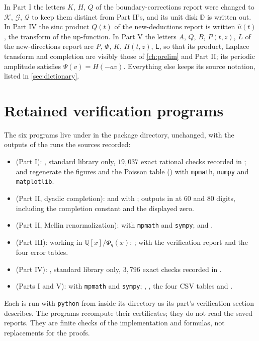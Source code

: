 \documentclass[11pt,a4paper,oneside,openany]{book}
\numberwithin{equation}{chapter}
\theoremstyle{definition}
\theoremstyle{remark}
\newcommand{\Q}{\mathbb Q}
\newcommand{\Lsad}{\mathsf L}
\begin{document}
In Part I the letters $K$, $H$, $Q$ of the boundary-corrections report were
changed to $\mathcal K$, $\mathcal G$, $\mathcal Q$ to keep them distinct
from Part II's, and its unit disk $\mathbb D$ is written out. In Part IV the
sinc product $Q(t)$ of the new-deductions report is written $\widehat u(t)$,
the transform of the up-function. In Part V the letters $A$, $Q$, $B$,
$P(t,z)$, $L$ of the new-directions report are $P$, $\Phi$, $K$, $\Pi(t,z)$,
$\Lsad$, so that its product, Laplace transform and completion are visibly
those of \cref{ch:prelim} and Part II; its periodic amplitude satisfies
$\Psi(v)=H(-av)$. Everything else keeps its source notation, listed in
\cref{sec:dictionary}.

\section{Retained verification programs}
The six programs live under  in the package directory,
unchanged, with the outputs of the runs the sources recorded:
\begin{itemize}
\item {} (Part I): , standard library only,
$19{,}037$ exact rational checks recorded in ;
 and  regenerate the figures
and the Poisson table () with
\texttt{mpmath}, \texttt{numpy} and \texttt{matplotlib}.
\item {} (Part II, dyadic completion): 
and  with ;
outputs in  at 60 and 80 digits, including the completion
constant and the displayed zero.
\item {} (Part II, Mellin renormalization):
 with \texttt{mpmath} and \texttt{sympy};
 and .
\item {} (Part III):  working in
$\Q[x]/\Phi_q(x)$; ;  with the
verification report and the four error tables.
\item {} (Part IV): , standard library only,
$3{,}796$ exact checks recorded in .
\item {} (Parts I and V):  with \texttt{mpmath}
and \texttt{sympy}; ,
, the four CSV tables and .
\end{itemize}
Each is run with \texttt{python} from inside its directory as its part's
verification section describes. The programs recompute their certificates;
they do not read the saved reports. They are finite checks of the
implementation and formulas, not replacements for the proofs.
\end{document}
